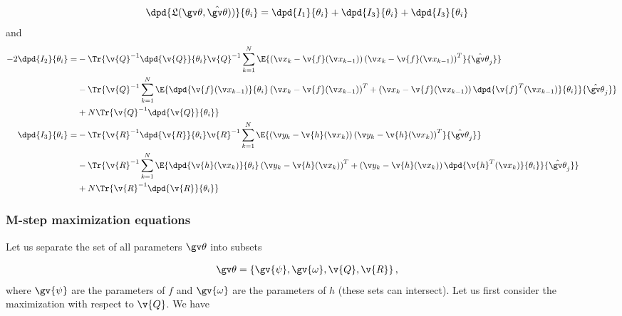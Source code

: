 \begin{align}
	\dpd{\Lb(\Th,\hat{\Th}))}{\theta_i}&=\dpd{I_1}{\theta_i}+\dpd{I_3}{\theta_i}+\dpd{I_3}{\theta_i}
	\label{eq:dLB_nonlinear_1}
\end{align}
and
\begin{align}
\begin{split}
	-2\dpd{I_2}{\theta_i}
	=&-\Tr{\v{Q}^{-1}\dpd{\v{Q}}{\theta_i}\v{Q}^{-1}
	\sum_{k=1}^N\E{\left(\x_k-\v{f}(\x_{k-1})\right)\left(\x_k-\v{f}(\x_{k-1})\right)^T}{\hat{\Th}_j}}\\
	&-\Tr{\v{Q}^{-1}\sum_{k=1}^N\E{\dpd{\v{f}(\x_{k-1})}{\theta_i}\left(\x_k-\v{f}(\x_{k-1})\right)^T+\left(\x_k-\v{f}(\x_{k-1})\right)\dpd{\v{f}^T(\x_{k-1})}{\theta_i}}{\hat{\Th}_j}}\\
	&+N\Tr{\v{Q}^{-1}\dpd{\v{Q}}{\theta_i}}\\
	\dpd{I_3}{\theta_i}=&
	-\Tr{\v{R}^{-1}\dpd{\v{R}}{\theta_i}\v{R}^{-1}
	\sum_{k=1}^N\E{\left(\y_k-\v{h}(\x_{k})\right)\left(\y_k-\v{h}(\x_{k})\right)^T}{\hat{\Th}_j}}\\
	&-\Tr{\v{R}^{-1}\sum_{k=1}^N\E{\dpd{\v{h}(\x_{k})}{\theta_i}\left(\y_k-\v{h}(\x_{k})\right)^T+\left(\y_k-\v{h}(\x_{k})\right)\dpd{\v{h}^T(\x_{k})}{\theta_i}}{\hat{\Th}_j}}\\
	&+N\Tr{\v{R}^{-1}\dpd{\v{R}}{\theta_i}}\\
	\label{eq:dLB_nonlinear}
\end{split}
\end{align}


\subsubsection{M-step maximization equations}

Let us separate the set of all parameters $\Th$ into
subsets

\begin{align}
	\Th&=\left\{\gv{\psi},\gv{\omega},\v{Q},\v{R}\right\},
\end{align}
where $\gv{\psi}$ are the parameters of $f$ and $\gv{\omega}$ are
the parameters of $h$ (these sets can intersect). Let us first consider
the maximization with respect to $\v{Q}$. We have

